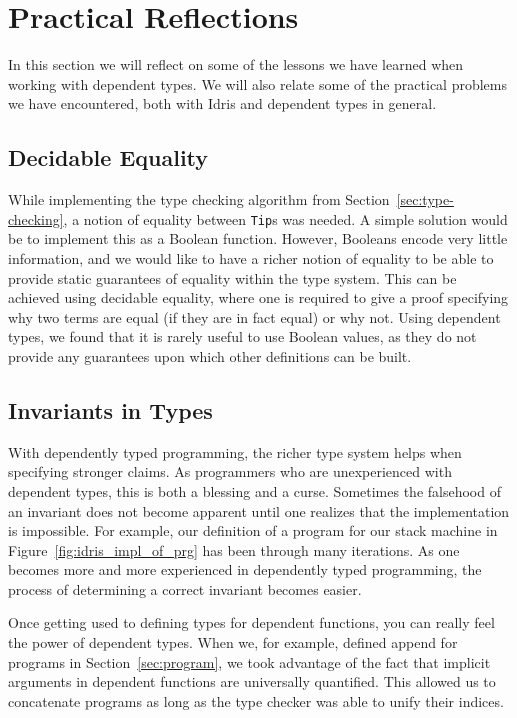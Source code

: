 \section{Practical Reflections}
\label{sec:practical-reflections}
In this section we will reflect on some of the lessons we have learned when working with dependent types. We will also relate some of the practical problems we have encountered, both with Idris and dependent types in general.

\subsection{Decidable Equality}
While implementing the type checking algorithm from Section~\ref{sec:type-checking}, a notion of equality between \texttt{Tip}s was needed. A simple solution would be to implement this as a Boolean function. However, Booleans encode very little information, and we would like to have a richer notion of equality to be able to provide static guarantees of equality within the type system. This can be achieved using decidable equality, where one is required to give a proof specifying why two terms are equal (if they are in fact equal) or why not. Using dependent types, we found that it is rarely useful to use Boolean values, as they do not provide any guarantees upon which other definitions can be built.

\subsection{Invariants in Types}
With dependently typed programming, the richer type system helps when specifying stronger claims. As programmers who are unexperienced with dependent types, this is both a blessing and a curse. Sometimes the falsehood of an invariant does not become apparent until one realizes that the implementation is impossible. For example, our definition of a program for our stack machine in Figure~\ref{fig:idris_impl_of_prg} has been through many iterations. As one becomes more and more experienced in dependently typed programming, the process of determining a correct invariant becomes easier.

Once getting used to defining types for dependent functions, you can really feel the power of dependent types. When we, for example, defined append for programs in Section~\ref{sec:program}, we took advantage of the fact that implicit arguments in dependent functions are universally quantified. This allowed us to concatenate programs as long as the type checker was able to unify their indices.

